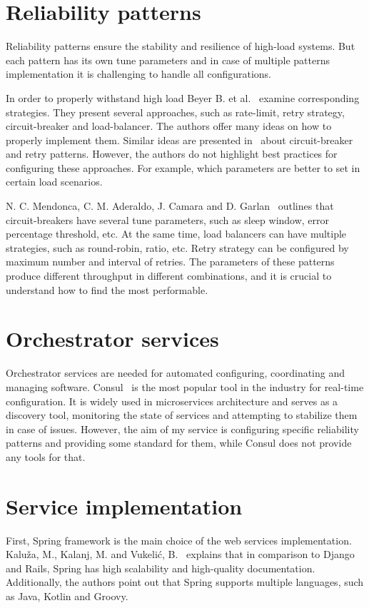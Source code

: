 \section{Reliability patterns}\label{sec:reliability}
Reliability patterns ensure the stability and resilience of high-load systems.
But each pattern has its own tune parameters and in case of multiple patterns implementation it is challenging to handle all configurations.

In order to properly withstand high load Beyer B. et al.~\cite{google_sre} examine corresponding strategies.
They present several approaches, such as rate-limit, retry strategy, circuit-breaker and load-balancer.
The authors offer many ideas on how to properly implement them.
Similar ideas are presented in~\cite{reliability_patterns} about circuit-breaker and retry patterns.
However, the authors do not highlight best practices for configuring these approaches.
For example, which parameters are better to set in certain load scenarios.

N. C. Mendonca, C. M. Aderaldo, J. Camara and D. Garlan~\cite{circuit_breaker} outlines that circuit-breakers have several tune parameters, such as sleep window, error percentage threshold, etc.
At the same time, load balancers can have multiple strategies, such as round-robin, ratio, etc.
Retry strategy can be configured by maximum number and interval of retries.
The parameters of these patterns produce different throughput in different combinations, and it is crucial to understand how to find the most performable.

\section{Orchestrator services}\label{sec:service-orchestrator}
Orchestrator services are needed for automated configuring, coordinating and managing software.
Consul~\cite{consul} is the most popular tool in the industry for real-time configuration.
It is widely used in microservices architecture and serves as a discovery tool, monitoring the state of services and attempting to stabilize them in case of issues.
However, the aim of my service is configuring specific reliability patterns and providing some standard for them, while Consul does not provide any tools for that.

\section{Service implementation}\label{sec:implementation}
First, Spring framework is the main choice of the web services implementation.
Kaluža, M., Kalanj, M. and Vukelić, B.~\cite{frameworks} explains that in comparison to Django and Rails, Spring has high scalability and high-quality documentation.
Additionally, the authors point out that Spring supports multiple languages, such as Java, Kotlin and Groovy.


